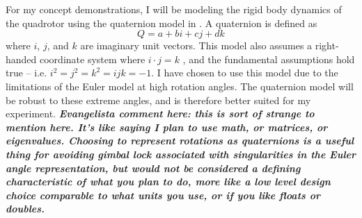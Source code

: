 \documentclass[onecolumn,10pt]{IEEEtran}
\begin{document}
For my concept demonstrations, I will be modeling the rigid body dynamics of the quadrotor using the quaternion model in \cite{greiff2017modeling}. A quaternion is defined as 
\begin{equation}
Q = a + b i + c j + d k
\end{equation}
where $i$, $j$, and $k$ are imaginary unit vectors. This model also assumes a right-handed coordinate system where $i\cdot j = k$ , and the fundamental assumptions hold true -- i.e.  $i^2 = j^2 = k^2 = ijk = -1$.  I have chosen to use this model due to the limitations of the Euler model at high rotation angles. The quaternion model will be robust to these extreme angles, and is therefore better suited for my experiment. \emph{\textbf{Evangelista comment here: this is sort of strange to mention here. It's like saying I plan to use math, or matrices, or eigenvalues. Choosing to represent rotations as quaternions is a useful thing for avoiding gimbal lock associated with singularities in the Euler angle representation, but would not be considered a defining characteristic of what you plan to do, more like a low level design choice comparable to what units you use, or if you like floats or doubles.}}
\end{document}
